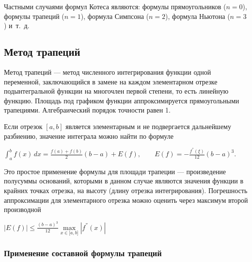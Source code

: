 \documentclass[a4paper]{article}
\begin{document}
{{{{{{{{Частными случаями формул Котеса являются: формулы прямоугольников
({{\(n = 0\)}}), формулы трапеций ({{\(n = 1\)}}), формула Симпсона
({{\(n = 2\)}}), формула Ньютона ({{\(n = 3\)}}) и~т.~д.

\subsection{Метод трапеций}

Метод трапеций — метод численного интегрирования функции одной переменной, заключающийся в замене на каждом элементарном отрезке подынтегральной функции на многочлен первой степени, то есть линейную функцию. Площадь под графиком функции аппроксимируется прямоугольными трапециями. Алгебраический порядок точности равен 1.

Если отрезок {{\(\left\lbrack {a,b} \right\rbrack\)}} является
элементарным и не подвергается дальнейшему разбиению, значение интеграла
можно найти по формуле

\begin{center}
 {{\(\int_{a}^{b}f(x)\, dx = \frac{f(a) + f(b)}{2}(b - a) + E(f),\qquad E(f) = - \frac{f^{''}(\xi)}{12}\left( {b - a} \right)^{3}.\)}}
\end{center}

Это простое применение формулы для площади трапеции --- произведение
полусуммы оснований, которыми в данном случае являются значения функции
в крайних точках отрезка, на высоту (длину отрезка интегрирования).
Погрешность аппроксимации для элементарного отрезка можно оценить через
максимум второй производной

\begin{center}
 {{\(\left| {E(f)} \right| \leqslant \frac{\left( {b - a} \right)^{3}}{12}\max\limits_{x \in \lbrack a,b\rbrack}\left| {f^{''}(x)} \right|\)}}
\end{center}

\subsubsection{Применение составной формулы трапеций}

}}}}}}}}
\end{document}
